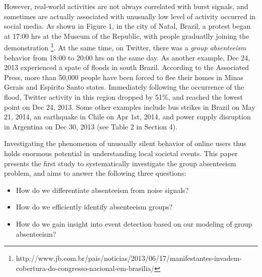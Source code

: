 However, real-world activities are not always correlated with burst signals, and sometimes
are actually associated with unusually low level of activity occurred in social media. As shown in
Figure 1, in the city of
Natal, Brazil, a protest began at 17:00 hrs at the Museum of the Republic, with
people graduatlly joining the demonstration \footnote{http://www.jb.com.br/pais/noticias/2013/06/17/manifestantes-invadem-cobertura-do-congresso-nacional-em-brasilia/}. At the same time, on
Twitter, there was a {\it group absenteeism} behavior from 18:00 to 20:00 hrs on the
same day. As another example, Dec 24, 2013 experienced a
spate of floods in south Brazil. According to the Associated Press, more than 50,000 people have been forced to flee their homes in Minas Gerais and Espirito Santo states. Immediately following the occurrence of
the flood, Twitter activity in this region dropped by 51\%, and reached the lowest point on Dec 24, 2013. Some other examples include bus strikes in Brazil on May 21, 2014, an
earthquake in Chile on Apr 1st, 2014, and power supply disruption in Argentina on Dec 30, 2013
(see Table 2 in Section 4).

Investigating the phenomenon of unusually silent behavior of online users thus
holds enormous potential in understanding local societal events.
This paper presents the first study to systematically investigate the group absenteeism problem, and aims to answer the following three questions:
\begin{itemize}
\item How do we differentiate absenteeism from noise signals?
\item How do we efficiently identify absenteeism groups?
\item How do we gain insight into event detection based on our modeling of group absenteeism?
\end{itemize}

